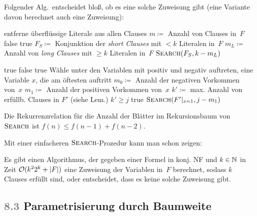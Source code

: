 \documentclass{cheat-sheet}
\newcommand{\size}[1]{\abs{#1}} %
\renewcommand{\O}{\mathcal{O}} %
\newcommand{\ceil}[1]{\lceil #1 \rceil} %
\newcommand{\scriptSection}[1]{\textcolor{gray}{#1}\enspace}
\begin{document}
Folgender Alg.\ entscheidet bloß, ob es eine solche Zuweisung gibt (eine Variante davon berechnet auch eine Zuweisung):

\begin{algorithmic}
    \State entferne überflüssige Literale aus allen Clauses
    \State $m \coloneqq $ Anzahl von Clauses in~$F$
     \Return false \EndIf
    \If{$k \leq \ceil{m/2}$} \Return true \EndIf
    \State $F_S \coloneqq $ Konjunktion der \textit{short Clauses} mit $< k$ Literalen in~$F$
    \State $m_L \coloneqq $ Anzahl von \textit{long Clauses} mit $\geq k$ Literalen in~$F$
    \State \Return $\Call{Search}{F_S, k - m_L}$
  \EndFunction

     \Return true \EndIf
     \Return false \EndIf
      \State \Return true
    \EndIf
    \State Wähle unter den Variablen mit positiv und negativ auftreten,
    \State \quad eine Variable $x$, die am öftesten auftritt
    \State $m_0 \coloneqq $ Anzahl der negativen Vorkommen von~$x$
    \State $m_1 \coloneqq $ Anzahl der positiven Vorkommen von~$x$
      \State $k' \coloneqq $ max. Anzahl von erfüllb. Clauses in $F'$ (siehe Lem.)
      \State \Return $k' \geq j$
    \EndIf
      \Return true
    \EndIf
    \Return $\Call{Search}{F'|_{x=1}, j - m_1}$
  \EndFunction
\end{algorithmic}

\begin{beweisidee}
  Die Rekurrenzrelation für die Anzahl der Blätter im Rekursionsbaum von~$\Call{Search}{}$ ist $f(n) \leq f(n-1) + f(n-2)$.
\end{beweisidee}

Mit einer einfacheren $\Call{Search}{}$-Prozedur kann man schon zeigen:

\begin{satz}
  Es gibt einen Algorithmus, der gegeben einer Formel in konj. NF und $k \in \mathbb{N}$ in Zeit $\O(k^2 2^k + \size{F})$ eine Zuweisung der Variablen in~$F$ berechnet, sodass $k$ Clauses erfüllt sind, oder entscheidet, dass es keine solche Zuweisung gibt.
\end{satz}

\subsection{\scriptSection{8.3} Parametrisierung durch Baumweite}
\end{document}
